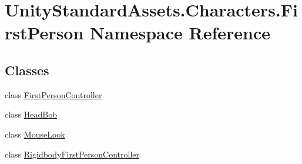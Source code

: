 \hypertarget{namespace_unity_standard_assets_1_1_characters_1_1_first_person}{}\section{Unity\+Standard\+Assets.\+Characters.\+First\+Person Namespace Reference}
\label{namespace_unity_standard_assets_1_1_characters_1_1_first_person}
\subsection*{Classes}
\begin{DoxyCompactItemize}
\item 
class \hyperlink{class_unity_standard_assets_1_1_characters_1_1_first_person_1_1_first_person_controller}{First\+Person\+Controller}
\item 
class \hyperlink{class_unity_standard_assets_1_1_characters_1_1_first_person_1_1_head_bob}{Head\+Bob}
\item 
class \hyperlink{class_unity_standard_assets_1_1_characters_1_1_first_person_1_1_mouse_look}{Mouse\+Look}
\item 
class \hyperlink{class_unity_standard_assets_1_1_characters_1_1_first_person_1_1_rigidbody_first_person_controller}{Rigidbody\+First\+Person\+Controller}
\end{DoxyCompactItemize}
